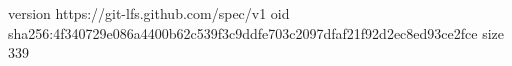 version https://git-lfs.github.com/spec/v1
oid sha256:4f340729e086a4400b62c539f3c9ddfe703c2097dfaf21f92d2ec8ed93ce2fce
size 339
